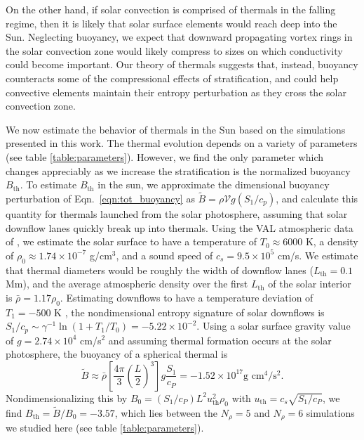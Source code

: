 On the other hand, if solar convection is comprised of thermals in the falling regime, then it is likely that solar surface elements would reach deep into the Sun.
Neglecting buoyancy, we expect that downward propagating vortex rings in the solar convection zone would likely compress to sizes on which conductivity could become important.
Our theory of thermals suggests that, instead, buoyancy counteracts some of the compressional effects of stratification, and could help convective elements maintain their entropy perturbation as they cross the solar convection zone.

We now estimate the behavior of thermals in the Sun based on the simulations presented in this work.
The thermal evolution depends on a variety of parameters (see table \ref{table:parameters}).
However, we find the only parameter which changes appreciably as we increase the stratification is the normalized buoyancy $B_\text{th}$.
To estimate $B_\text{th}$ in the sun, we approximate the dimensional buoyancy perturbation of Eqn.~\ref{eqn:tot_buoyancy} as $\tilde{B} = \rho \mathcal{V} g (S_1/c_p)$, and calculate this quantity for thermals launched from the solar photosphere, assuming that solar downflow lanes quickly break up into thermals.
Using the VAL atmospheric data of \cite{avrett&loeser2008}, we estimate the solar surface to have a temperature of $T_0 \approx 6000$ K, a density of $\rho_0 \approx 1.74 \times 10^{-7}$ g/cm$^3$, and a sound speed of $c_s = 9.5 \times 10^5$ cm/s.
We estimate that thermal diameters would be roughly the width of downflow lanes ($L_{\text{th}} = 0.1$ Mm), and the average atmospheric density over the first $L_{\text{th}}$ of the solar interior is $\bar{\rho} = 1.17\rho_0$.
Estimating downflows to have a temperature deviation of $T_1 = -500$ K \cite{borrero&bellotrubio2002}, the nondimensional entropy signature of solar downflows is $S_1/c_p \sim \gamma^{-1}\ln(1 + T_1/T_0) = -5.22 \times 10^{-2}$.
Using a solar surface gravity value of $g = 2.74 \times 10^4$ cm/s$^2$ and assuming thermal formation occurs at the solar photosphere, the buoyancy of a spherical thermal is 
$$
\tilde{B} \approx \bar{\rho}\left[\frac{4\pi}{3} \left(\frac{L}{2}\right)^3\right] g \frac{S_1}{c_P} = -1.52 \times 10^{17} \text{g cm}^4/\text{s}^2.
$$
Nondimensionalizing this by $B_0 = (S_1/c_P) L^2 u_{\text{th}}^2 \rho_0$ with $u_{\text{th}} = c_s \sqrt{S_1/c_P}$, we find $B_\text{th} = \tilde{B}/B_0 = -3.57$, which lies between the $N_\rho = 5$ and $N_\rho = 6$ simulations we studied here (see table \ref{table:parameters}).

